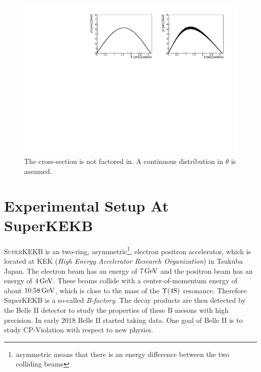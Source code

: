 \documentclass[a4paper,11pt,twosided,final,german,openbib,pdftex,listof=totoc,bibliography=totoc]{scrbook}
\begin{document}
\begin{figure}[h!]
	\centering
\includegraphics[width=\textwidth]{Bilder/CptTheta}
	\caption[$\theta$-pt-Distribution In The CMS And LAB Frame]{The cross-section is not factored in. A continuous distribution in $\theta$ is assumed.}
	
\end{figure}





\chapter{Experimental Setup At SuperKEKB}
\label{sec:SetupKEK}

\lettrine{S}{uperKEKB} is an two-ring, asymmetric\footnote{asymmetric means that there is an energy difference between the two colliding beams}, electron positron accelerator, which is located at KEK (\textit{High Energy Accelerator Research Organization}) in Tsukuba Japan. 
The electron beam has an energy of $7\,\textnormal{GeV}$ 
and the positron beam has an energy of $4\,\textnormal{GeV}$. These beams collide with a center-of-momentum energy of about $10.58\,\textnormal{GeV}$, which is close to the mass of the $\Upsilon(4\textnormal{S})$ resonance. Therefore SuperKEKB is a so-called \textit{B-factory}. The decay products are then detected by the  Belle II detector to study the properties of these B mesons with high precision. In early 2018 Belle II started taking data. One goal of Belle II is to study CP-Violation with respect to new physics.\cite{B2B}
\end{document}
